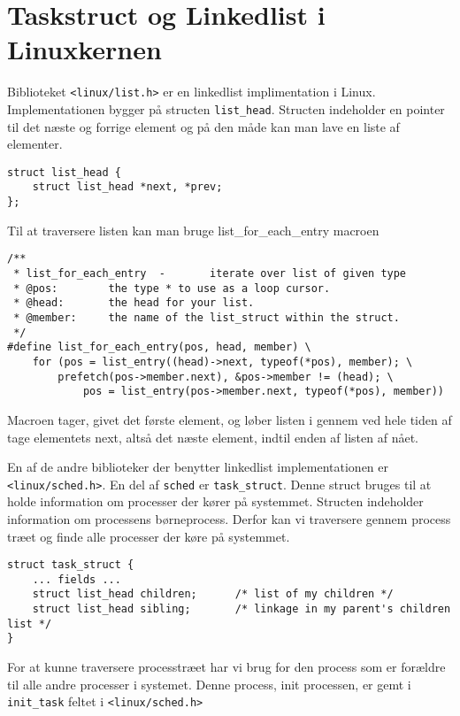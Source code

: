 \documentclass[danish]{report}
\begin{document}
\section{Taskstruct og Linkedlist i Linuxkernen}

Biblioteket \texttt{<linux/list.h>} er en linkedlist implimentation i Linux. Implementationen bygger på structen \texttt{list\_head}. Structen indeholder en pointer til det næste og forrige element og på den måde kan man lave en liste af elementer.

\begin{lstlisting}
struct list_head {
    struct list_head *next, *prev;
};
\end{lstlisting}

Til at traversere listen kan man bruge list\_for\_each\_entry macroen

\begin{lstlisting}
/**
 * list_for_each_entry  -       iterate over list of given type
 * @pos:        the type * to use as a loop cursor.
 * @head:       the head for your list.
 * @member:     the name of the list_struct within the struct.
 */
#define list_for_each_entry(pos, head, member) \
    for (pos = list_entry((head)->next, typeof(*pos), member); \
        prefetch(pos->member.next), &pos->member != (head); \
            pos = list_entry(pos->member.next, typeof(*pos), member))
\end{lstlisting}

Macroen tager, givet det første element, og løber listen i gennem ved hele tiden af tage elementets next, altså det næste element, indtil enden af listen af nået.

En af de andre biblioteker der benytter linkedlist implementationen er \texttt{<linux/sched.h>}. En del af \texttt{sched} er \texttt{task\_struct}. Denne struct bruges til at holde information om processer der kører på systemmet. Structen indeholder information om processens børneprocess. Derfor kan vi traversere gennem process træet og finde alle processer der køre på systemmet.

\begin{lstlisting}
struct task_struct {
    ... fields ...
    struct list_head children;      /* list of my children */
    struct list_head sibling;       /* linkage in my parent's children list */
}
\end{lstlisting}

For at kunne traversere processtræet har vi brug for den process som er forældre til alle andre processer i systemet. Denne process, init processen, er gemt i \texttt{init\_task} feltet i \texttt{<linux/sched.h>}
\end{document}

